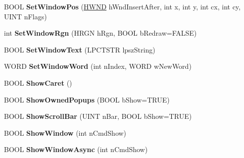 \begin{DoxyCompactItemize}
\item 
\mbox{\label{class_a_t_l_1_1_c_window_a390e9880e1f87f63295cdba566086c80}} 
B\+O\+OL {\bfseries Set\+Window\+Pos} (\hyperlink{interfacevoid}{H\+W\+ND} h\+Wnd\+Insert\+After, int x, int y, int cx, int cy, U\+I\+NT n\+Flags)
\item 
\mbox{\label{class_a_t_l_1_1_c_window_a1f9b9b9da6ec371309b1a9d5967f52fc}} 
int {\bfseries Set\+Window\+Rgn} (H\+R\+GN h\+Rgn, B\+O\+OL b\+Redraw=F\+A\+L\+SE)
\item 
\mbox{\label{class_a_t_l_1_1_c_window_a6e21583fa856c7fb9e62f4820051da18}} 
B\+O\+OL {\bfseries Set\+Window\+Text} (L\+P\+C\+T\+S\+TR lpsz\+String)
\item 
\mbox{\label{class_a_t_l_1_1_c_window_a1936f2fdb4cb7a869e4dce8d33b495ca}} 
W\+O\+RD {\bfseries Set\+Window\+Word} (int n\+Index, W\+O\+RD w\+New\+Word)
\item 
\mbox{\label{class_a_t_l_1_1_c_window_a4b79674342d6d587eb68c6bd56614f98}} 
B\+O\+OL {\bfseries Show\+Caret} ()
\item 
\mbox{\label{class_a_t_l_1_1_c_window_a1c0968696c36dfef6ee2fe580cb7abdb}} 
B\+O\+OL {\bfseries Show\+Owned\+Popups} (B\+O\+OL b\+Show=T\+R\+UE)
\item 
\mbox{\label{class_a_t_l_1_1_c_window_a42d9c2439226f01b1f06c90e3c767527}} 
B\+O\+OL {\bfseries Show\+Scroll\+Bar} (U\+I\+NT n\+Bar, B\+O\+OL b\+Show=T\+R\+UE)
\item 
\mbox{\label{class_a_t_l_1_1_c_window_aaa776c912100d427d7394c24f92657fe}} 
B\+O\+OL {\bfseries Show\+Window} (int n\+Cmd\+Show)
\item 
\mbox{\label{class_a_t_l_1_1_c_window_a0c4d7f4aa9249210fd1e97ea8edf6bf6}} 
B\+O\+OL {\bfseries Show\+Window\+Async} (int n\+Cmd\+Show)
\item 
\mbox{\label{class_a_t_l_1_1_c_window_a9f6822d259a1514ffd3f69a1b2b8a552}} 

\end{DoxyCompactItemize}
